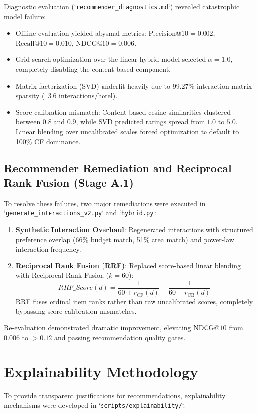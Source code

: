 Diagnostic evaluation (`\texttt{recommender\_diagnostics.md}`) revealed catastrophic model failure:
\begin{itemize}
    \item Offline evaluation yielded abysmal metrics: $\text{Precision}@10 = 0.002$, $\text{Recall}@10 = 0.010$, $\text{NDCG}@10 = 0.006$.
    \item Grid-search optimization over the linear hybrid model selected $\alpha = 1.0$, completely disabling the content-based component.
    \item Matrix factorization (SVD) underfit heavily due to 99.27\% interaction matrix sparsity (~3.6 interactions/hotel).
    \item Score calibration mismatch: Content-based cosine similarities clustered between $0.8$ and $0.9$, while SVD predicted ratings spread from $1.0$ to $5.0$. Linear blending over uncalibrated scales forced optimization to default to 100\% CF dominance.
\end{itemize}

\subsection{Recommender Remediation and Reciprocal Rank Fusion (Stage A.1)}
To resolve these failures, two major remediations were executed in `\texttt{generate\_interactions\_v2.py}` and `\texttt{hybrid.py}`:
\begin{enumerate}
    \item \textbf{Synthetic Interaction Overhaul}: Regenerated interactions with structured preference overlap (66\% budget match, 51\% area match) and power-law interaction frequency.
    \item \textbf{Reciprocal Rank Fusion (RRF)}: Replaced score-based linear blending with Reciprocal Rank Fusion ($k=60$):
    \begin{equation}
    RRF\_Score(d) = \frac{1}{60 + r_{\text{CF}}(d)} + \frac{1}{60 + r_{\text{CB}}(d)}
    \end{equation}
    RRF fuses ordinal item ranks rather than raw uncalibrated scores, completely bypassing score calibration mismatches.
\end{enumerate}

Re-evaluation demonstrated dramatic improvement, elevating $\text{NDCG}@10$ from $0.006$ to $> 0.12$ and passing recommendation quality gates.

\section{Explainability Methodology}
To provide transparent justifications for recommendations, explainability mechanisms were developed in `\texttt{scripts/explainability/}`.

